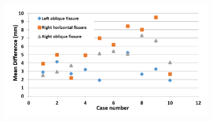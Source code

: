{\begin{figure}[htbp] 
\centering
\begin{subfigure}{.6\linewidth}%
  \includegraphics[width=\linewidth,trim={{.0\wd0} {.0\wd0} {.0\wd0} {.0\wd0}},clip]{Segmentation/Image/NormalMeanDifference.png} %
  \caption{}
  \label{fig:QuantitativeResult-a} 
\end{subfigure} 
\begin{subfigure}{.6\linewidth}%

\end{subfigure}
\end{figure}}
